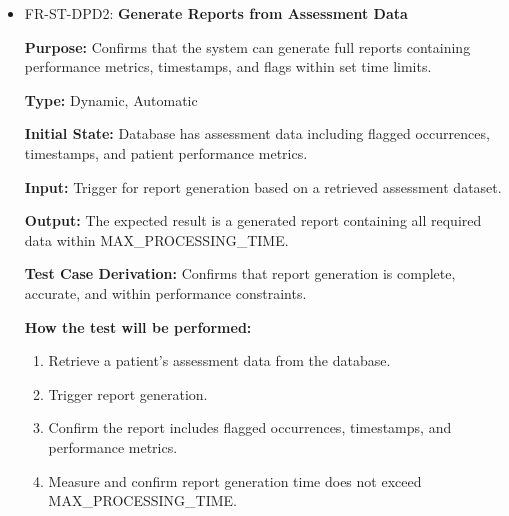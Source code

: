 \documentclass[12pt, titlepage]{article}
\begin{document}
\begin{itemize}
  \item FR-ST-DPD2: \textbf{Generate Reports from Assessment Data}
  \begin{mdframed}[linewidth=0.5mm]
      \textbf{Purpose:} Confirms that the system can generate full reports containing \\ performance metrics, timestamps, and flags within set time limits. \par
      \textbf{Type:} Dynamic, Automatic \par
      \textbf{Initial State:} Database has assessment data including flagged occurrences, \\ timestamps, and patient performance metrics. \par
      \textbf{Input:} Trigger for report generation based on a retrieved assessment dataset. \par
      \textbf{Output:} The expected result is a generated report containing all required data within MAX\_PROCESSING\_TIME. \par
      \textbf{Test Case Derivation:} Confirms that report generation is complete, accurate, and within performance constraints. \par
      \textbf{How the test will be performed:}
      \begin{enumerate}[noitemsep]
        \item Retrieve a patient’s assessment data from the database.
        \item Trigger report generation.
        \item Confirm the report includes flagged occurrences, timestamps, and performance metrics.
        \item Measure and confirm report generation time does not exceed \\ MAX\_PROCESSING\_TIME.
      \end{enumerate}
  \end{mdframed}


\end{itemize}
\end{document}
